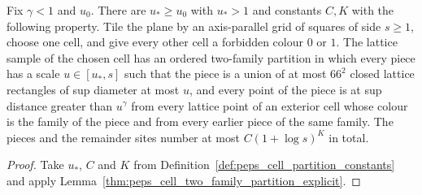 \begin{lemma}
    \label{thm:peps_cell_two_family_partition}
    \leanok
    Fix $\gamma<1$ and $u_0$. There are $u_*\ge u_0$ with $u_*>1$ and constants
    $C,K$ with the following property. Tile the plane by an axis-parallel grid
    of squares of side $s\ge1$, choose one cell, and give every other cell a
    forbidden colour $0$ or $1$. The lattice sample of the chosen cell has an
    ordered two-family partition in which every piece has a scale
    $u\in[u_*,s]$ such that the piece is a union of at most $66^2$ closed
    lattice rectangles of sup diameter at most $u$, and every point of the
    piece is at sup distance greater than $u^{\gamma}$ from every lattice point
    of an exterior cell whose colour is the family of the piece and from every
    earlier piece of the same family. The pieces and the remainder sites
    number at most $C(1+\log s)^{K}$ in total.
\end{lemma}
\begin{proof}\leanok
    Take $u_*$, $C$ and $K$ from
    Definition~\ref{def:peps_cell_partition_constants} and apply
    Lemma~\ref{thm:peps_cell_two_family_partition_explicit}.
\end{proof}
